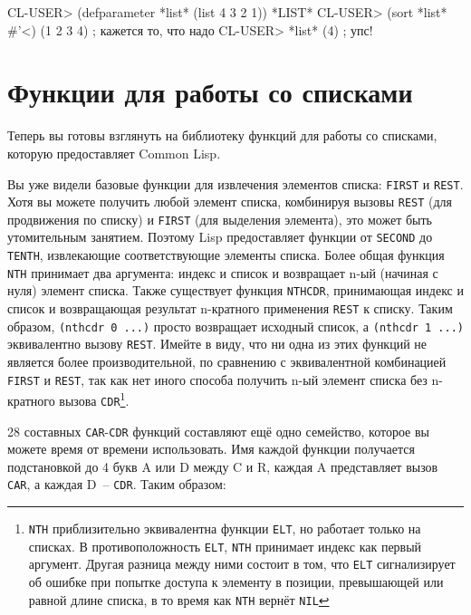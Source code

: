 \begin{myverb}
CL-USER> (defparameter *list* (list 4 3 2 1))
*LIST*
CL-USER> (sort *list* #'<)
(1 2 3 4)                      ; кажется то, что надо
CL-USER> *list*
(4)                            ; упс!
\end{myverb}


\section{Функции для работы со списками}
\label{sec:12-list-funcs}

Теперь вы готовы взглянуть на библиотеку функций для работы со списками, которую
предоставляет Common Lisp.

Вы уже видели базовые функции для извлечения элементов списка: \lstinline{FIRST} и
\lstinline{REST}. Хотя вы можете получить любой элемент списка, комбинируя вызовы \lstinline{REST}
(для продвижения по списку) и \lstinline{FIRST} (для выделения элемента), это может быть
утомительным занятием. Поэтому Lisp предоставляет функции от \lstinline{SECOND} до \lstinline{TENTH},
извлекающие соответствующие элементы списка. Более общая функция \lstinline{NTH} принимает два
аргумента: индекс и список и возвращает n-ый (начиная с нуля) элемент списка. Также
существует функция \lstinline{NTHCDR}, принимающая индекс и список и возвращающая результат
n-кратного применения \lstinline{REST} к списку. Таким образом, \lstinline{(nthcdr 0 ...)}  просто
возвращает исходный список, а \lstinline{(nthcdr 1 ...)}  эквивалентно вызову
\lstinline{REST}. Имейте в виду, что ни одна из этих функций не является более производительной,
по сравнению с эквивалентной комбинацией \lstinline{FIRST} и \lstinline{REST}, так как нет иного
способа получить n-ый элемент списка без n-кратного вызова \lstinline{CDR}\footnote{\lstinline{NTH}
  приблизительно эквивалентна функции \lstinline{ELT}, но работает только на списках. В
  противоположность \lstinline{ELT}, \lstinline{NTH} принимает индекс как первый аргумент. Другая
  разница между ними состоит в том, что \lstinline{ELT} сигнализирует об ошибке при попытке
  доступа к элементу в позиции, превышающей или равной длине списка, в то время как
  \lstinline{NTH} вернёт \lstinline{NIL}}.

28 составных \lstinline{CAR}-\lstinline{CDR} функций составляют ещё одно семейство, которое вы можете время
от времени использовать. Имя каждой функции получается подстановкой до 4 букв A или D
между C и R, каждая A представляет вызов \lstinline{CAR}, а каждая D~-- \lstinline{CDR}. Таким
образом:

